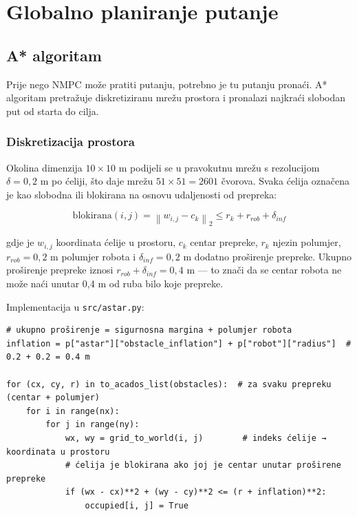 
\chapter{Globalno planiranje putanje}
\label{pog:astar}

\section{A* algoritam}

Prije nego NMPC može pratiti putanju, potrebno je tu putanju pronaći. A* algoritam \cite{hart1968astar, lavalle2006planning} pretražuje diskretiziranu mrežu prostora i pronalazi najkraći slobodan put od starta do cilja.

\subsection{Diskretizacija prostora}

Okolina dimenzija $10 \times 10$ m podijeli se u pravokutnu mrežu s rezolucijom $\delta = 0{,}2$ m po ćeliji, što daje mrežu $51 \times 51 = 2601$ čvorova. Svaka ćelija označena je kao slobodna ili blokirana na osnovu udaljenosti od prepreka:

\begin{equation}
  \text{blokirana}(i,j) = \left\| w_{i,j} - c_k \right\|_2 \leq r_k + r_{rob} + \delta_{inf}
\end{equation}

gdje je $w_{i,j}$ koordinata ćelije u prostoru, $c_k$ centar prepreke, $r_k$ njezin polumjer, $r_{rob} = 0{,}2$ m polumjer robota i $\delta_{inf} = 0{,}2$ m dodatno proširenje prepreke. Ukupno proširenje prepreke iznosi $r_{rob} + \delta_{inf} = 0{,}4$ m --- to znači da se centar robota ne može naći unutar 0,4 m od ruba bilo koje prepreke.

Implementacija u \texttt{src/astar.py}:

\begin{listing}[H]
\begin{verbatim}
# ukupno proširenje = sigurnosna margina + polumjer robota
inflation = p["astar"]["obstacle_inflation"] + p["robot"]["radius"]  # 0.2 + 0.2 = 0.4 m

for (cx, cy, r) in to_acados_list(obstacles):  # za svaku prepreku (centar + polumjer)
    for i in range(nx):
        for j in range(ny):
            wx, wy = grid_to_world(i, j)        # indeks ćelije → koordinata u prostoru
            # ćelija je blokirana ako joj je centar unutar proširene prepreke
            if (wx - cx)**2 + (wy - cy)**2 <= (r + inflation)**2:
                occupied[i, j] = True
\end{verbatim}
\caption{Označavanje blokiranih ćelija u \texttt{src/astar.py}}
\end{listing}


